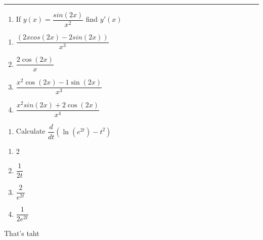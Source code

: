 \begin{center}\rule{0.5\linewidth}{0.5pt}\end{center}

\begin{enumerate}
\def\labelenumi{\arabic{enumi}.}
\tightlist
\item
  If \(y(x) = \dfrac{sin(2x)}{x^2}\) find \(y'(x)\)
\end{enumerate}

\begin{enumerate}
\def\labelenumi{(\Alph{enumi})}
\tightlist
\item
  \(\dfrac{(2 x cos(2 x) - 2 sin(2 x))}{x^3}\)
\item
  \(\dfrac{ 2 \cos(2x)}{x}\)
\item
  \(\dfrac{ x^2 \cos(2x) - 1 \sin(2x)} { x^3}\)
\item
  \(\dfrac{ x^2 sin(2x) + 2 \cos(2x)} {x^4}\)
\end{enumerate}

\begin{enumerate}
\def\labelenumi{\arabic{enumi}.}
\setcounter{enumi}{1}
\tightlist
\item
  Calculate \(\dfrac{d}{dt} \left( \ln(e^{2t}) - t^2 \right)\)
\end{enumerate}

\begin{enumerate}
\def\labelenumi{(\Alph{enumi})}
\tightlist
\item
  2
\item
  \(\dfrac{1}{2t}\)
\item
  \(\dfrac{2}{e^{2t}}\)
\item
  \(\dfrac{1}{2e^{2t}}\)
\end{enumerate}

That's taht

